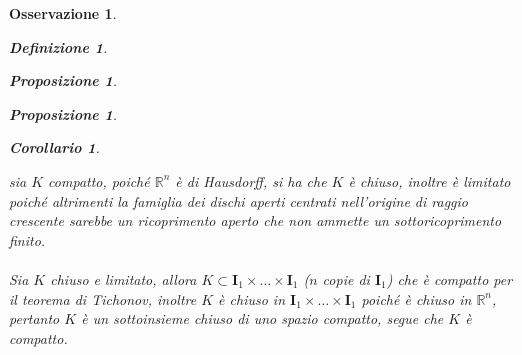 \documentclass[oneside, 11pt]{amsbook}
\makeatletter
\newcommand{\0}{{(0)}}
\newcommand{\3}{{(3)}}
\theoremstyle{colonplain}
\newtheorem{prop}[thm]{Proposizione}
\newtheorem{cor}[thm]{Corollario}
\theoremstyle{colondefinition}
\newtheorem{defn}[thm]{Definizione}
\theoremstyle{colonremark}
\newtheorem{rmk}[thm]{Osservazione}
\numberwithin{equation}{chapter}
\renewcommand{\proofname}{Dimostrazione}
\renewenvironment{proof}[1][\proofname]{\par
  \pushQED{\end{proof}}%
  \normalfont \topsep6\p@\@plus6\p@\relax
  \trivlist
  \item[\hskip\labelsep\bfseries #1:]\ignorespaces
}{%
  \popQED\endtrivlist\@endpefalse
}
\makeatother
\begin{document}
\begin{rmk}
\begin{defn}
\begin{prop}
\begin{prop}
\begin{cor}
\end{cor}
\begin{proof}
sia $K$ compatto, poiché $\mathbb{R}^n$ è di Hausdorff, si ha che $K$ è chiuso, inoltre è limitato poiché altrimenti la famiglia dei dischi aperti centrati nell'origine di raggio crescente sarebbe un ricoprimento aperto che non ammette un sottoricoprimento finito. \\ \\
Sia $K$ chiuso e limitato, allora $K \subset \mathbf{I}_1 \times \dots \times \mathbf{I}_1$ ($n$ copie di $\mathbf{I}_1$) che è compatto per il \textit{teorema di Tichonov}, inoltre $K$ è chiuso in $\mathbf{I}_1 \times \dots \times \mathbf{I}_1$ poiché è chiuso in $\mathbb{R}^n$, pertanto $K$ è un sottoinsieme chiuso di uno spazio compatto, segue che $K$ è compatto.
\end{proof}


\end{prop}
\end{prop}
\end{defn}
\end{rmk}
\end{document}
